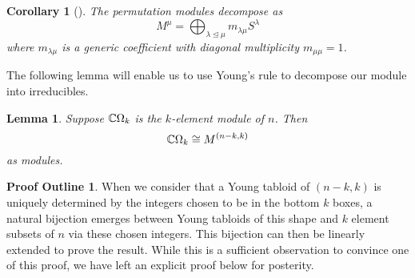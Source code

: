 \documentclass[12pt,twoside]{reedthesis}
\theoremstyle{plain}   %
\newtheorem{cor}{Corollary}[section]
\newtheorem{lemma}{Lemma}[section]
\theoremstyle{definition}
\newtheorem{outline}{Proof Outline}[section]
\theoremstyle{remark}
\numberwithin{equation}{section}
\def\normeq{\trianglelefteq}
\begin{document}
  \begin{cor}[{\cite[2.4.7]{sagan}}]
    The permutation modules decompose as
    \[M^\mu = \bigoplus_{\lambda \normeq \mu} m_{\lambda \mu} S^\lambda \]
    where $m_{\lambda\mu}$ is a generic coefficient with diagonal multiplicity $m_{\mu \mu} =1$.
  \end{cor}
  The following lemma will enable us to use Young's rule to decompose our module into irreducibles.
  \begin{lemma}
    Suppose $\mathbb{C} \Omega_k $ is the $k$-element module of $n$. Then
    \[ \mathbb{C} \Omega_k  \cong M^{(n-k,k)}\]
    as modules.
  \end{lemma}
  \begin{outline}
    When we consider that a Young tabloid of $(n-k,k)$ is uniquely determined by the integers chosen to be in the bottom $k$ boxes, a natural
    bijection emerges between Young tabloids of this shape and $k$ element subsets of $n$ via these chosen integers.
    This bijection can then be linearly extended to prove the result.
    While this is a sufficient observation to convince one of this proof, we have left an explicit proof below for posterity.
  \end{outline}
\end{document}
